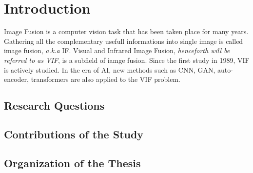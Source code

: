 \chapter{Introduction}
\label{chp:intro}

Image Fusion is a computer vision task that has been taken place for many years. Gathering all the complementary usefull informations into single image is called image fusion, \emph{a.k.a} IF. Visual and Infrared Image Fusion, \emph{henceforth will be referred to as VIF}, is a subfield of iamge fusion. Since the first study \cite{toet1989merging} in 1989, VIF is actively studied. In the era of AI, new methods such as CNN, GAN, auto-encoder, transformers are also applied to the VIF problem.

\section{Research Questions}



\section{Contributions of the Study}    


\section{Organization of the Thesis}